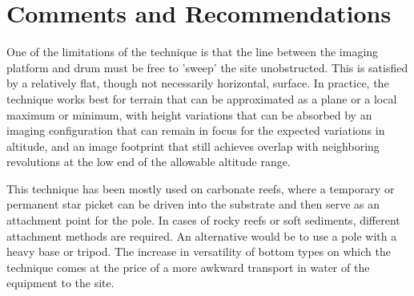 \section{Comments and Recommendations}


One of the limitations of the technique is that the line between the imaging platform and drum must be free to 'sweep' the site unobstructed. This is satisfied by a relatively flat, though not necessarily horizontal, surface. In practice, the technique works best for terrain that can be approximated as a plane or a local maximum or minimum, with height variations that can be absorbed by an imaging configuration that can remain in focus for the expected variations in altitude, and an image footprint that still achieves overlap with neighboring revolutions at the low end of the allowable altitude range.

This technique has been mostly used on carbonate reefs, where a temporary or permanent star picket can be driven into the substrate and then serve as an attachment point for the pole. In cases of rocky reefs or soft sediments, different attachment methods are required. An alternative would be to use a pole with a heavy base or tripod. The increase in versatility of bottom types on which the technique comes at the price of a more awkward transport in water of the equipment to the site. 